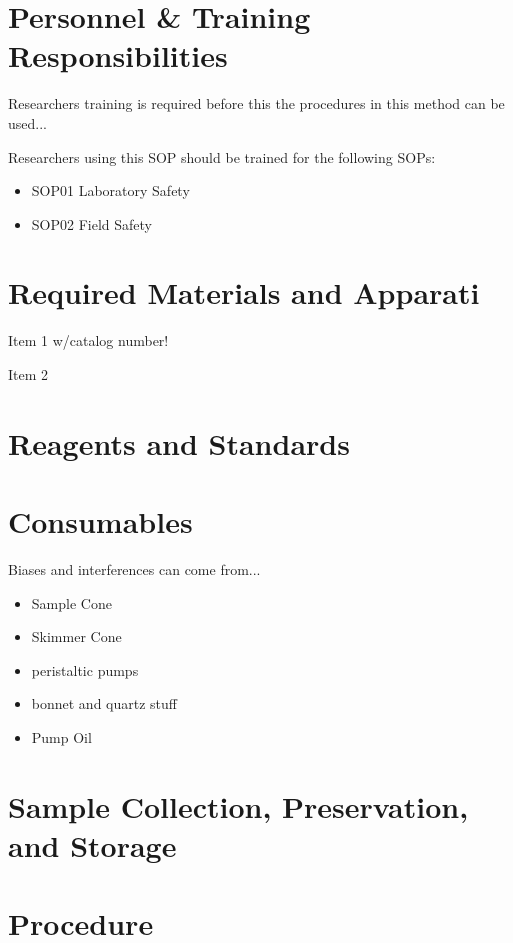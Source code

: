 \documentclass[12pt]{../SOP4_alpha}\usepackage[]{graphicx}\usepackage[]{color}
\begin{document}
\section{Personnel \& Training Responsibilities}

\NP Researchers training is required before this the procedures in this method can be used... 

\NP Researchers using this SOP should be trained for the following SOPs:

\begin{itemize}
  \item SOP01 Laboratory Safety
  \item SOP02 Field Safety
\end{itemize}

\section{Required Materials and Apparati}

\NP Item 1 w/catalog number!

\NP Item 2

\section{Reagents and Standards}

\section{Consumables}

\NP Biases and interferences can come from...

\begin{itemize}
  \item Sample Cone
  \item Skimmer Cone
  \item peristaltic pumps
  \item bonnet and quartz stuff
  \item Pump Oil
\end{itemize}




\section{Sample Collection, Preservation, and Storage}

\section{Procedure}
\end{document}
